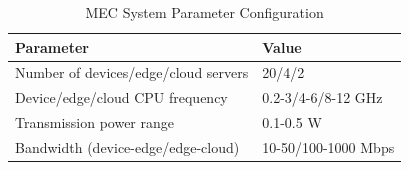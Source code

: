 \documentclass[conference]{IEEEtran}
\begin{document}
\begin{table}[!b]
\small
\centering
\caption{MEC System Parameter Configuration}
\label{tab:system}
\begin{tabular}{|l|l|}
\hline
Parameter & Value \\
\hline
Number of devices/edge/cloud servers & 20/4/2 \\
Device/edge/cloud CPU frequency & 0.2-3/4-6/8-12 GHz \\
Transmission power range & 0.1-0.5 W \\
Bandwidth (device-edge/edge-cloud) & 10-50/100-1000 Mbps \\
\hline
\end{tabular}
\end{table}


\end{document}
